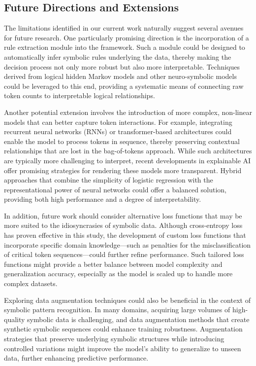\documentclass{article}
\begin{document}
\subsection*{Future Directions and Extensions}
The limitations identified in our current work naturally suggest several avenues for future research. One particularly promising direction is the incorporation of a rule extraction module into the framework. Such a module could be designed to automatically infer symbolic rules underlying the data, thereby making the decision process not only more robust but also more interpretable. Techniques derived from logical hidden Markov models and other neuro-symbolic models could be leveraged to this end, providing a systematic means of connecting raw token counts to interpretable logical relationships.

Another potential extension involves the introduction of more complex, non-linear models that can better capture token interactions. For example, integrating recurrent neural networks (RNNs) or transformer-based architectures could enable the model to process tokens in sequence, thereby preserving contextual relationships that are lost in the bag-of-tokens approach. While such architectures are typically more challenging to interpret, recent developments in explainable AI offer promising strategies for rendering these models more transparent. Hybrid approaches that combine the simplicity of logistic regression with the representational power of neural networks could offer a balanced solution, providing both high performance and a degree of interpretability.

In addition, future work should consider alternative loss functions that may be more suited to the idiosyncrasies of symbolic data. Although cross-entropy loss has proven effective in this study, the development of custom loss functions that incorporate specific domain knowledge—such as penalties for the misclassification of critical token sequences—could further refine performance. Such tailored loss functions might provide a better balance between model complexity and generalization accuracy, especially as the model is scaled up to handle more complex datasets.

Exploring data augmentation techniques could also be beneficial in the context of symbolic pattern recognition. In many domains, acquiring large volumes of high-quality symbolic data is challenging, and data augmentation methods that create synthetic symbolic sequences could enhance training robustness. Augmentation strategies that preserve underlying symbolic structures while introducing controlled variations might improve the model’s ability to generalize to unseen data, further enhancing predictive performance.
\end{document}
